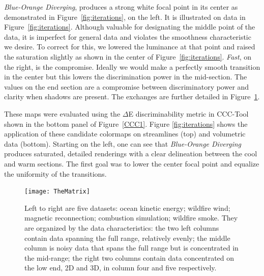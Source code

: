 \documentclass{IEEEcsmag}
\newcommand*{\colormap}[1]{\textsl{#1}\xspace}
\newcommand*{\blueorange}{\colormap{Blue-Orange Diverging}}
\newcommand*{\fast}{\colormap{Fast}}
\begin{document}


\blueorange, produces a strong white focal point in its center as demonstrated in Figure~\ref{fig:iterations}, on the left. %
It is illustrated on data in Figure~\ref{fig:iterations}.
Although valuable for designating the middle point of the data, it is imperfect for general data and violates the smoothness characteristic we desire.
To correct for this, we lowered the luminance at that point and raised the saturation slightly as shown in the center of Figure~\ref{fig:iterations}.
\fast, on the right, is the compromise.
Ideally we would make a perfectly smooth transition in the center but this lowers the discrimination power in the mid-section.
The values on the end section are a compromise between discriminatory power and clarity when shadows are present.
The exchanges are further detailed in Figure~\ref{fig:Matrix}.





These maps were evaluated using the $\Delta$E discriminability metric in CCC-Tool shown in the bottom panel of Figure~\ref{CCC1}. Figure \ref{fig:iterations} shows the application of these candidate colormaps on streamlines (top) and volumetric data (bottom).
Starting on the left, one can see that \blueorange produces saturated, detailed renderings with a clear delineation between the cool and warm sections.
The first goal was to lower the center focal point and equalize the uniformity of the transitions.

\begin{figure}[t]
\centering
\texttt{[image: TheMatrix]}
\caption{Left to right are five datasets: ocean kinetic energy; wildfire wind; magnetic reconnection; combustion simulation; wildfire smoke. They are organized by the data characteristics: the two left columns contain data spanning the full range, relatively evenly; the middle column is noisy data that spans the full range but is concentrated in the mid-range; the right two columns contain data concentrated on the low end, 2D and 3D, in column four and five respectively. }
\label{fig:Matrix}
\end{figure}
\end{document}
